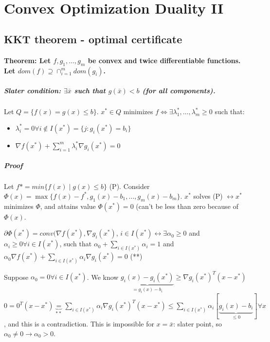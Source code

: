 \documentclass[main]{subfiles}
\begin{document}

\section{Convex Optimization Duality II}
\subsection{KKT theorem - optimal certificate}
\paragraph{Theorem: Let $f, g_{1}, \dots, g_{m}$ be convex and twice
differentiable functions. Let $dom(f) \supseteq \cap_{i = 1}^{m} dom (g_{i})$.}

\subparagraph{Slater condition: $\exists \bar{x}$ such that $ g( \bar{x} ) < b$
(for all components).}

Let $Q = \{ f(x) = g(x) \leq b \}$.
$x^{*} \in Q$ minimizes $f \iff \exists \lambda^{*}_{1}, \dots,
\lambda^{*}_{m} \geq 0$ such that:
\begin{itemize}
\item $\lambda^{*}_{i} = 0 \forall i \notin I(x^{*}) = \{j: g_i(x^*) = b_i\}$
\item $\nabla f(x^{*}) + \sum_{i=1}^m \lambda^{*}_{i} \nabla g_{i}(x^{*}) = 0$
\end{itemize}

\subparagraph{Proof}
Let $f{*} = min \{ f(x) \mid g(x) \leq b \}$ (P). Consider $\Phi (x) = \max
\{ f(x) - f^{*}, g_{1}(x)-b_{1}, \dots, g_{m}(x)-b_{m} \}$. $x^{*}$ solves (P)
$\leftrightarrow x^{*}$ minimizes $\Phi$, and attains value $\Phi (x^{*}) =0$
(can't be less than zero because of $\Phi(x)$.

$\partial \Phi (x^{*}) = conv(\nabla f(x^{*}), \nabla g_{i}(x^{*})$, $i \in
I(x^{*}) \leftrightarrow \exists \alpha_{0} \geq 0$ and $\alpha_{i} \geq 0
\forall i \in I(x^{*})$, such that $\alpha_{0} + \sum_{i \in I(x^{*})}
\alpha_{i} = 1$ and $\alpha_{0} \nabla f(x^{*}) + \sum_{i \in I(x^{*})}
\alpha_{i} \nabla g_{i}(x^{*}) = 0$ (**)

Suppose $\alpha_{0} = 0 \forall i \in I(x^{*})$. We know $\underbrace{g_{i}(x)
- g_{i}(x^{*})}_{= g_{i}(x) -b_{i}} \geq \nabla g_{i}(x^{*})^{T}(x - x^{*})$\\
$0 = 0^{T}(x-x^{*}) \underbrace{=}_{**} \sum_{i \in I(x^{*})} \alpha_{i} \nabla
g_{i}(x^{*})^{T}(x-x^{*}) \leq \sum_{i \in I(x^{*})} \alpha_{i}
[\underbrace{g_{i}(x)-b_{i}}_{\leq 0}] \forall x$, and this is a contradiction.
This is impossible for $x = \bar{x}$: slater point, so $\alpha_{0} \neq 0
\rightarrow \alpha_{0} > 0$.
\end{document}
